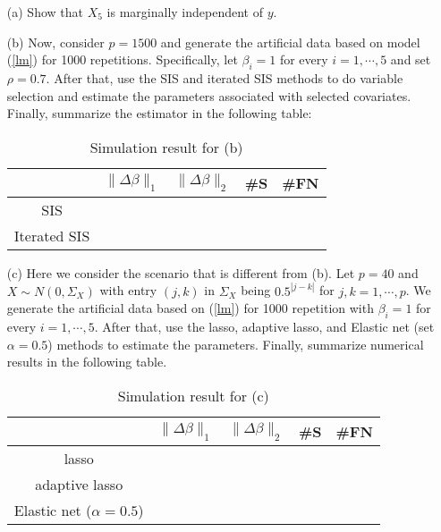 \documentclass[11pt]{article}
\begin{document}
\begin{enumerate}
\begin{itemize}

\item[(a)] Show that $X_5$ is marginally independent of $y$.


\item[(b)] Now, consider $p=1500$ and generate the artificial data based on model (\ref{lm}) for 1000 repetitions. Specifically, let $\beta_i=1$ for every $i=1,\cdots,5$ and set $\rho=0.7$. After that, use the SIS and iterated SIS methods to do variable selection and estimate the parameters associated with selected covariates. Finally, summarize the estimator in the following table:

\begin{table}[!ht]
       \huge
     \caption{Simulation result for (b)}

   \scriptsize

 \centering
  \renewcommand{\arraystretch}{0.9}
 \begin{tabular}{c c c c c}
 \\
 \hline
& $\|\Delta\beta\|_1$ & $\|\Delta\beta\|_2$ & \#S & \#FN \\
\hline
SIS & \\
Iterated SIS & \\ 
 \hline 
\end{tabular}

\end{table}


\item[(c)] Here we consider the scenario that is different from (b). Let $p=40$ and $X \sim N(0,\Sigma_X)$ with entry $(j,k)$ in $\Sigma_X$ being $0.5^{|j-k|}$ for $j,k=1,\cdots,p$. We generate the artificial data based on (\ref{lm}) for 1000 repetition with  $\beta_i=1$ for every $i=1,\cdots,5$. After that, use the lasso, adaptive lasso, and Elastic net (set $\alpha=0.5$) methods to estimate the parameters. Finally, summarize numerical results in the following table.


\begin{table}[!ht]
       \huge
     \caption{Simulation result for (c)}

   \scriptsize

 \centering
  \renewcommand{\arraystretch}{0.9}
 \begin{tabular}{c c c c c}
 \\
 \hline
& $\|\Delta\beta\|_1$ & $\|\Delta\beta\|_2$ & \#S & \#FN \\
\hline
lasso & \\
adaptive lasso & \\
Elastic net ($\alpha=0.5$) & \\ 
 \hline 
\end{tabular}


\end{table}
\end{itemize}
\end{enumerate}
\end{document}
